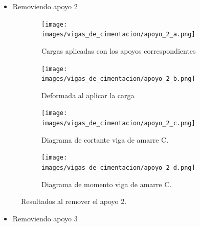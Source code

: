 \documentclass[12pt]{article}
\begin{document}
\newpage
\begin{itemize}
    \item Removiendo apoyo $2$
\end{itemize}

\begin{figure}[H]
\begin{subfigure}{.5\textwidth}
  \centering
  \texttt{[image: images/vigas\_de\_cimentacion/apoyo\_2\_a.png]}  
  \caption{Cargas aplicadas con los apoyos correspondientes}
  \label{fig:Cargas removiendo AP2}
\end{subfigure}
\begin{subfigure}{.5\textwidth}
  \centering
  \texttt{[image: images/vigas\_de\_cimentacion/apoyo\_2\_b.png]}  
  \caption{Deformada al aplicar la carga}
  \label{fig:Deformada AP2}
\end{subfigure}

\begin{subfigure}{.5\textwidth}
  \centering
  \texttt{[image: images/vigas\_de\_cimentacion/apoyo\_2\_c.png]}  
  \caption{Diagrama de cortante viga de amarre C.}
  \label{fig:Cortante AP2}
\end{subfigure}
\begin{subfigure}{.45\textwidth}
  \centering
  \texttt{[image: images/vigas\_de\_cimentacion/apoyo\_2\_d.png]}  
  \caption{Diagrama de momento viga de amarre C.}
  \label{fig:Momento AP2}
\end{subfigure}
\caption{Resultados al remover el apoyo 2.}
\label{fig:R apoyo 2}
\end{figure}


\newpage
\begin{itemize}
    \item Removiendo apoyo $3$
\end{itemize}
\end{document}
